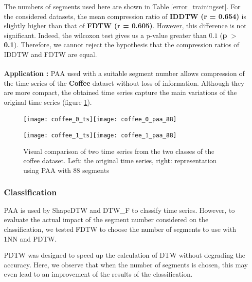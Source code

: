 The numbers of segments used here are shown in Table \ref{error_trainingset}. For the considered datasets, the mean compression ratio of \textbf{IDDTW (r = 0.654)}  is slightly higher than that
of \textbf{FDTW (r = 0.605)}. However, this difference is not significant. Indeed, the wilcoxon test
gives us a p-value greater than $0.1$ (\textbf{p} $>$ \textbf{0.1}). Therefore, we cannot reject the hypothesis that the
compression ratios of IDDTW and FDTW are equal.
\\

\paragraph{}\textbf{Application : } 
PAA used with a suitable segment number allows compression of the time series of
the \textbf{Coffee} dataset without loss of information. Although they are more compact, the obtained time series
capture the main variations of the original time series (figure \ref{coffee}).

\begin{figure}

\texttt{[image: coffee\_0\_ts]}\texttt{[image: coffee\_0\_paa\_88]}

\texttt{[image: coffee\_1\_ts]}\texttt{[image: coffee\_1\_paa\_88]}

\caption{Visual comparison of two time series from the two classes of the coffee dataset. Left: the original time series, right:  representation using PAA with 88 segments}

\label{coffee}
\end{figure}


\subsubsection{Classification}

PAA is used by ShapeDTW \cite{zhao2016shapedtw} and DTW\_F \cite{Kate2016} to classify time series. However, to evaluate the actual impact of the segment number considered on the classification, we tested FDTW to choose the
number of segments to use with 1NN and PDTW. 


PDTW was designed to speed up the calculation of DTW without degrading the accuracy. Here, we observe that when the number of segments is chosen, this may even lead to an improvement of the results of the classification.



\\
